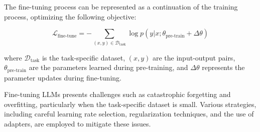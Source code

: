             The fine-tuning process can be represented as a continuation of the training process, optimizing the following objective:
            
            \begin{equation}
            \mathcal{L}_{\text{fine-tune}} = -\sum_{(x,y) \in \mathcal{D}_{\text{task}}} \log p(y | x; \theta_{\text{pre-train}} + \Delta\theta)
            \end{equation}
            
            where $\mathcal{D}_{\text{task}}$ is the task-specific dataset, $(x,y)$ are the input-output pairs, $\theta_{\text{pre-train}}$ are the parameters learned during pre-training, and $\Delta\theta$ represents the parameter updates during fine-tuning.
            \vspace*{0.2cm}

            Fine-tuning LLMs presents challenges such as catastrophic forgetting and overfitting, particularly when the task-specific dataset is small. Various strategies, including careful learning rate selection, regularization techniques, and the use of adapters, are employed to mitigate these issues.
            
